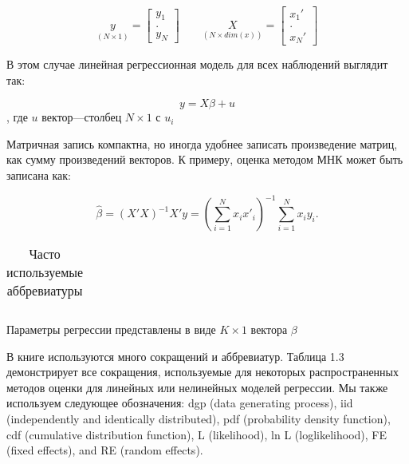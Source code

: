 \[
\underset{(N\times1)}{y} = \begin{bmatrix} y_{1} \\.\\ y_{N} \end{bmatrix} \qquad 
\underset{(N\times dim(x))}{X} = \begin{bmatrix} x_{1}' \\.\\ x_{N}' \end{bmatrix}
\]

В этом случае линейная регрессионная модель для всех наблюдений выглядит так:

\[
y=X\beta+u
\]
,
где $u$ вектор---столбец $ N \times 1 $ с $u_{i}$

Матричная запись компактна, но иногда удобнее записать произведение матриц, как сумму произведений векторов. К примеру, оценка методом МНК может быть записана как:

\[
\hat{\beta}=(X'X)^{-1}X'y=(\sum_{i=1}^N x_i x'_i)^{-1}\sum_{i=1}^N x_i y_i.
\]
	
\begin{table}[h]
\begin{center}
\caption{\label{tab:pred}Часто используемые аббревиатуры}
\begin{tabular}[t]{llcll|}
\hline

\hline
\end{tabular}
\end{center}
\end{table}	


Параметры регрессии представлены в виде $ K \times 1 $  вектора $ \beta $


В книге используются много сокращений и аббревиатур. Таблица 1.3 демонстрирует все сокращения, используемые для некоторых распространенных методов оценки для линейных или нелинейных моделей регрессии. Мы также используем следующее обозначения: dgp (data generating process), iid (independently and identically distributed), pdf (probability density function), cdf (cumulative distribution function), L (likelihood), ln L (loglikelihood), FE (fixed effects), and RE (random effects).









